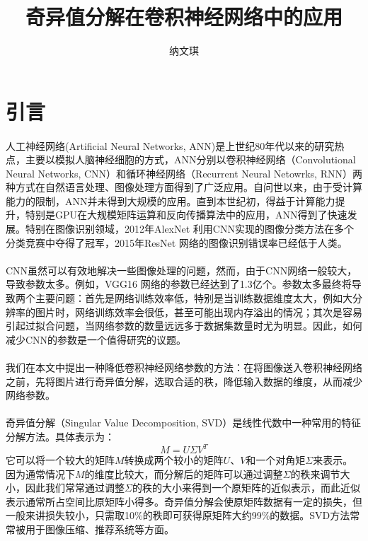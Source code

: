 \documentclass[12pt,a4paper]{article}
\begin{document}

\title{奇异值分解在卷积神经网络中的应用}
\author[*]{纳文琪}
\date{}
\maketitle


\section{引言}
\paragraph{} 人工神经网络(Artificial Neural Networks, ANN)是上世纪80年代以来的研究热点，主要以模拟人脑神经细胞的方式，ANN分别以卷积神经网络（Convolutional Neural Networks, CNN）和循环神经网络（Recurrent Neural Netowrks, RNN）两种方式在自然语言处理、图像处理方面得到了广泛应用。自问世以来，由于受计算能力的限制，ANN并未得到大规模的应用。直到本世纪初，得益于计算能力提升，特别是GPU在大规模矩阵运算和反向传播算法中的应用，ANN得到了快速发展。特别在图像识别领域，2012年AlexNet\cite{alexnet} 利用CNN实现的图像分类方法在多个分类竞赛中夺得了冠军，2015年ResNet\cite{resnet} 网络的图像识别错误率已经低于人类。
\paragraph{} CNN虽然可以有效地解决一些图像处理的问题，然而，由于CNN网络一般较大，导致参数太多。例如，VGG16\cite{vgg} 网络的参数已经达到了1.3亿个。参数太多最终将导致两个主要问题：首先是网络训练效率低，特别是当训练数据维度太大，例如大分辨率的图片时，网络训练效率会很低，甚至可能出现内存溢出的情况；其次是容易引起过拟合问题，当网络参数的数量远远多于数据集数量时尤为明显。因此，如何减少CNN的参数是一个值得研究的议题。
\paragraph{} 我们在本文中提出一种降低卷积神经网络参数的方法：在将图像送入卷积神经网络之前，先将图片进行奇异值分解，选取合适的秩，降低输入数据的维度，从而减少网络参数。
\paragraph{} 奇异值分解（Singular Value Decomposition, SVD）是线性代数中一种常用的特征分解方法。具体表示为：
\begin{equation}
	M=U\Sigma V^T
\end{equation}
它可以将一个较大的矩阵$M$转换成两个较小的矩阵$U$、$V$和一个对角矩$\Sigma$来表示。因为通常情况下$M$的维度比较大，而分解后的矩阵可以通过调整$\Sigma$的秩来调节大小，因此我们常常通过调整$\Sigma$的秩的大小来得到一个原矩阵的近似表示，而此近似表示通常所占空间比原矩阵小得多。奇异值分解会使原矩阵数据有一定的损失，但一般来讲损失较小，只需取10\%的秩即可获得原矩阵大约99\%的数据。SVD方法常常被用于图像压缩、推荐系统等方面。
\end{document}
